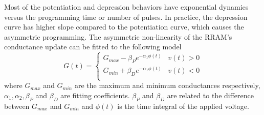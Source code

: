 \documentclass[english]{article}
\begin{document}
Most of the potentiation and depression behaviors have exponential dynamics versus the programming time or number of pulses. 
In practice, the depression curve has higher slope compared to the potentiation curve, which causes the asymmetric programming.
The asymmetric non-linearity of the RRAM's conductance update can be fitted to the following model 
\begin{equation}
G(t)= \left\{ \begin{matrix}
G_{max}-\beta_P e^{-\alpha_1 \phi(t)} & v(t)>0 \\
G_{min}+\beta_D e^{-\alpha_1 \phi(t)} & v(t)<0\\
\end{matrix}
\right.
\label{ANM}
\end{equation}
%
\noindent where $G_{max}$ and $G_{min}$ are the maximum and minimum conductances respectively, $\alpha_1, \alpha_2, \beta_P$ and $\beta_D$ are fitting coefficients. $\beta_P$ and $\beta_D$ are related to the difference between $G_{max}$ and $G_{min}$ and $\phi(t)$ is the time integral of the applied voltage. 
\end{document}
